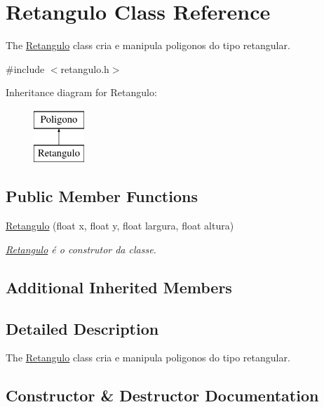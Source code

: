 \hypertarget{class_retangulo}{}\section{Retangulo Class Reference}
\label{class_retangulo}


The \mbox{\hyperlink{class_retangulo}{Retangulo}} class cria e manipula poligonos do tipo retangular.  




{\ttfamily \#include $<$retangulo.\+h$>$}

Inheritance diagram for Retangulo\+:\begin{figure}[H]
\begin{center}
\leavevmode
\includegraphics[height=2.000000cm]{class_retangulo}
\end{center}
\end{figure}
\subsection*{Public Member Functions}
\begin{DoxyCompactItemize}
\item 
\mbox{\hyperlink{class_retangulo_acca1dd211eefc8dc04658c943c0d1122}{Retangulo}} (float x, float y, float largura, float altura)
\begin{DoxyCompactList}\small\item\em \mbox{\hyperlink{class_retangulo}{Retangulo}} é o construtor da classe. \end{DoxyCompactList}\end{DoxyCompactItemize}
\subsection*{Additional Inherited Members}


\subsection{Detailed Description}
The \mbox{\hyperlink{class_retangulo}{Retangulo}} class cria e manipula poligonos do tipo retangular. 

\subsection{Constructor \& Destructor Documentation}
\mbox{\label{class_retangulo_acca1dd211eefc8dc04658c943c0d1122}} 
